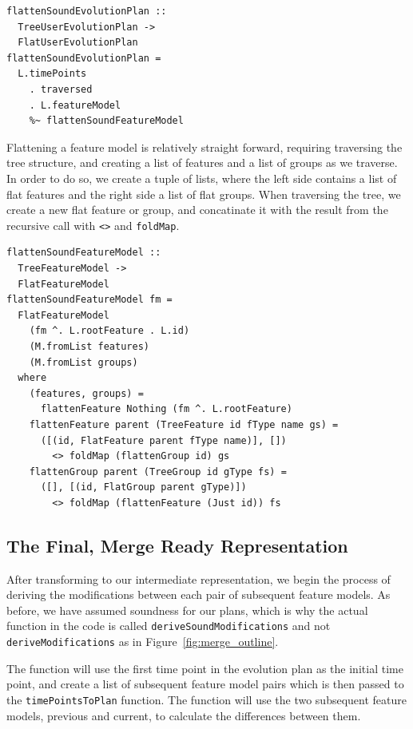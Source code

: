 \documentclass[a4paper,english]{ifimaster}
\begin{document}
\begin{verbatim}
flattenSoundEvolutionPlan :: 
  TreeUserEvolutionPlan -> 
  FlatUserEvolutionPlan
flattenSoundEvolutionPlan =
  L.timePoints
    . traversed
    . L.featureModel
    %~ flattenSoundFeatureModel
\end{verbatim}

Flattening a feature model is relatively straight forward, requiring traversing the tree structure, and creating a list of features and a list of groups as we traverse. In order to do so, we create a tuple of lists, where the left side contains a list of flat features and the right side a list of flat groups. When traversing the tree, we create a new flat feature or group, and concatinate it with the result from the recursive call with \texttt{<>} and \texttt{foldMap}.

\begin{verbatim}
flattenSoundFeatureModel :: 
  TreeFeatureModel -> 
  FlatFeatureModel
flattenSoundFeatureModel fm =
  FlatFeatureModel
    (fm ^. L.rootFeature . L.id)
    (M.fromList features)
    (M.fromList groups)
  where
    (features, groups) = 
      flattenFeature Nothing (fm ^. L.rootFeature)
    flattenFeature parent (TreeFeature id fType name gs) =
      ([(id, FlatFeature parent fType name)], [])
        <> foldMap (flattenGroup id) gs
    flattenGroup parent (TreeGroup id gType fs) =
      ([], [(id, FlatGroup parent gType)])
        <> foldMap (flattenFeature (Just id)) fs
\end{verbatim}

\subsection{The Final, Merge Ready Representation}%
\label{sub:the_final_merge_ready_representation}

After transforming to our intermediate representation, we begin the process of deriving the modifications between each pair of subsequent feature models. As before, we have assumed soundness for our plans, which is why the actual function in the code is called \texttt{deriveSoundModifications} and not \texttt{deriveModifications} as in Figure~\ref{fig:merge_outline}.

The function will use the first time point in the evolution plan as the initial time point, and create a list of subsequent feature model pairs which is then passed to the \texttt{timePointsToPlan} function. The function will use the two subsequent feature models, previous and current, to calculate the differences between them.
\end{document}
